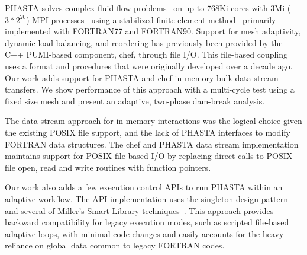 PHASTA solves complex fluid flow
problems~\cite{Gal10,Rod13,sahni2009scalable,Zhou-flow,phasta_github}
on up to 768Ki cores with 3Mi ($3*2^{20}$) MPI processes~\cite{rasquinCise2014} using a
stabilized finite element method~\cite{WhiJan01} primarily implemented with
FORTRAN77 and FORTRAN90.
Support for mesh adaptivity, dynamic load balancing, and reordering has
previously been provided by the C++ PUMI-based component,
chef, through file I/O.
This file-based coupling uses a format and procedures that were originally
developed over a decade ago.
Our work adds support for PHASTA and chef in-memory bulk data stream transfers.
We show performance of this approach with a multi-cycle test using a fixed
size mesh and present an adaptive, two-phase dam-break analysis.

The data stream approach for in-memory interactions was the logical choice
given the existing POSIX file support, and the lack of PHASTA
interfaces to modify FORTRAN data structures.
The chef and PHASTA data stream implementation maintains
support for POSIX file-based I/O by replacing direct calls to POSIX file open,
read and write routines with function pointers.

Our work also adds a few execution control APIs to run PHASTA within
an adaptive workflow.
The API implementation uses the singleton design
pattern~\cite{andreiDesignPatterns} and several of Miller's Smart Library
techniques~\cite{Miller2004}.
This approach provides backward compatibility for legacy execution modes,
such as scripted file-based adaptive loops, with minimal code changes and easily
accounts for the heavy reliance on global data common to legacy FORTRAN codes.
